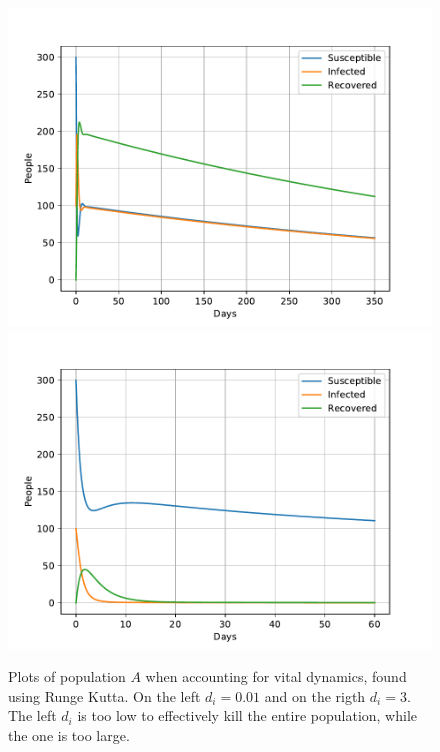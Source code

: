 \documentclass[a4paper]{article}
\begin{document}
	\begin{figure}[!htb]
		\centering 
		\includegraphics[scale=0.56]{../plots/opp_c_k3.pdf} %
		\includegraphics[scale=0.56]{../plots/opp_c_k0.pdf}
		\caption{Plots of population $A$ when accounting for vital dynamics, found using Runge Kutta. On the left $d_i=0.01$ and on the rigth $d_i=3$. The left $d_i$ is too low to effectively kill the entire population, while the one is too large.}
		\label{opp_c0}
	\end{figure}
\end{document}
